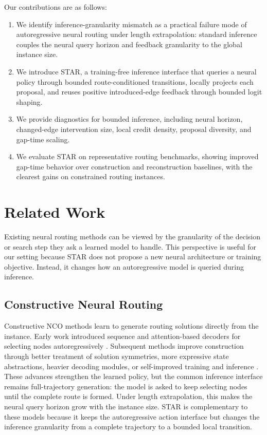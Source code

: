 \documentclass[11pt]{article}
\newcommand{\method}{\textsc{STAR}}
\begin{document}
Our contributions are as follows:
\begin{enumerate}[leftmargin=*,noitemsep]
  \item We identify inference-granularity mismatch as a practical failure mode of autoregressive neural routing under length extrapolation: standard inference couples the neural query horizon and feedback granularity to the global instance size.
  \item We introduce \method{}, a training-free inference interface that queries a neural policy through bounded route-conditioned transitions, locally projects each proposal, and reuses positive introduced-edge feedback through bounded logit shaping.
  \item We provide diagnostics for bounded inference, including neural horizon, changed-edge intervention size, local credit density, proposal diversity, and gap-time scaling.
  \item We evaluate \method{} on representative routing benchmarks, showing improved gap-time behavior over construction and reconstruction baselines, with the clearest gains on constrained routing instances.
\end{enumerate}

\section{Related Work}

Existing neural routing methods can be viewed by the granularity of the decision or search step they ask a learned model to handle. This perspective is useful for our setting because \method{} does not propose a new neural architecture or training objective. Instead, it changes how an autoregressive model is queried during inference.

\subsection{Constructive Neural Routing}

Constructive NCO methods learn to generate routing solutions directly from the instance. Early work introduced sequence and attention-based decoders for selecting nodes autoregressively \citep{pointernetwork,attentionmodel}. Subsequent methods improve construction through better treatment of solution symmetries, more expressive state abstractions, heavier decoding modules, or self-improved training and inference \citep{pomo,bq,lehd,sil}. These advances strengthen the learned policy, but the common inference interface remains full-trajectory generation: the model is asked to keep selecting nodes until the complete route is formed. Under length extrapolation, this makes the neural query horizon grow with the instance size. \method{} is complementary to these models because it keeps the autoregressive action interface but changes the inference granularity from a complete trajectory to a bounded local transition.
\end{document}
